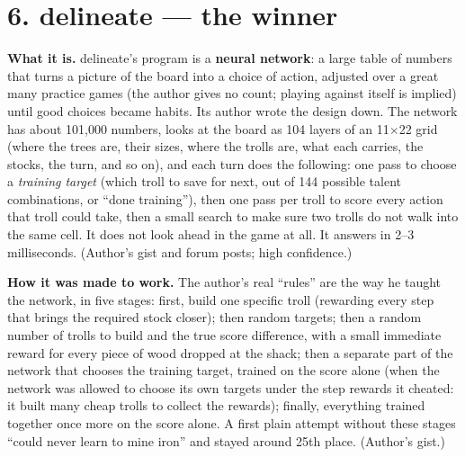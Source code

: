 \documentclass[10pt,a4paper]{article}
\newcommand{\src}[1]{{\small\color{muted}#1}}
\begin{document}
\section*{6. delineate --- the winner}

\textbf{What it is.} delineate's program is a \textbf{neural network}: a large table of numbers that turns a picture of the board into a choice of action, adjusted over a great many practice games (the author gives no count; playing against itself is implied) until good choices became habits. Its author wrote the design down. The network has about 101,000 numbers, looks at the board as 104 layers of an 11$\times$22 grid (where the trees are, their sizes, where the trolls are, what each carries, the stocks, the turn, and so on), and each turn does the following: one pass to choose a \emph{training target} (which troll to save for next, out of 144 possible talent combinations, or ``done training''), then one pass per troll to score every action that troll could take, then a small search to make sure two trolls do not walk into the same cell. It does not look ahead in the game at all. It answers in 2--3 milliseconds. \src{(Author's gist and forum posts; high confidence.)}

\textbf{How it was made to work.} The author's real ``rules'' are the way he taught the network, in five stages: first, build one specific troll (rewarding every step that brings the required stock closer); then random targets; then a random number of trolls to build and the true score difference, with a small immediate reward for every piece of wood dropped at the shack; then a separate part of the network that chooses the training target, trained on the score alone (when the network was allowed to choose its own targets under the step rewards it cheated: it built many cheap trolls to collect the rewards); finally, everything trained together once more on the score alone. A first plain attempt without these stages ``could never learn to mine iron'' and stayed around 25th place. \src{(Author's gist.)}
\end{document}
